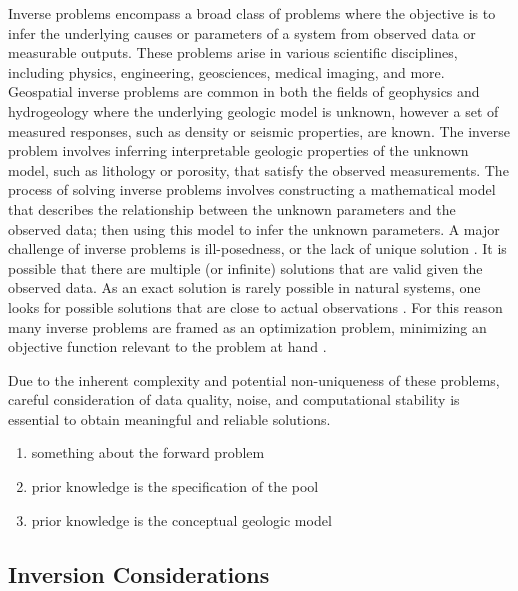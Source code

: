 Inverse problems encompass a broad class of problems where the objective is to infer the underlying causes or parameters of a system from observed data or measurable outputs. These problems arise in various scientific disciplines, including physics, engineering, geosciences, medical imaging, and more. Geospatial inverse problems are common in both the fields of geophysics \citep{linde2015geological} and hydrogeology \citep{zhou2014inverse} where the underlying geologic model is unknown, however a set of measured responses, such as density or seismic properties, are known. The inverse problem involves inferring interpretable geologic properties of the unknown model, such as lithology or porosity, that satisfy the observed measurements. The process of solving inverse problems involves constructing a mathematical model that describes the relationship between the unknown parameters and the observed data; then using this model to infer the unknown parameters. A major challenge of inverse problems is ill-posedness, or the lack of unique solution \citep{tarantola2005inverse}. It is possible that there are multiple (or infinite) solutions that are valid given the observed data. As an exact solution is rarely possible in natural systems, one looks for possible solutions that are close to actual observations \citep{bardossy2016random}. For this reason many inverse problems are framed as an optimization problem, minimizing an objective function relevant to the problem at hand \citep{giraud2019integration,nava-flores2023high,athens2022stochastic}.






Due to the inherent complexity and potential non-uniqueness of these problems, careful consideration of data quality, noise, and computational stability is essential to obtain meaningful and reliable solutions.

\begin{enumerate}
    \item something about the forward problem
    \item prior knowledge is the specification of the pool
    \item prior knowledge is the conceptual geologic model
\end{enumerate}

\subsection{Inversion Considerations}
\label{subsec:03invconsider}


